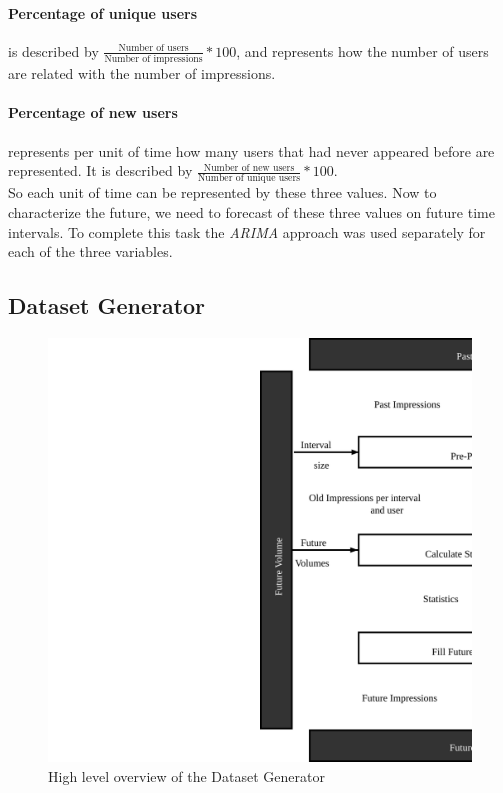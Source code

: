 \paragraph{Percentage of unique users}
is described by $\frac{\text{Number of users}}{\text{Number of impressions}}
* 100$, and represents how the number of users are related with the number of
impressions.

\paragraph{Percentage of new users}
represents per unit of time how many users that had never appeared before are
represented. It is described by $\frac{\text{Number of new users}}{\text{Number
of unique users}}*100$.
\\

So each unit of time can be represented by these three values. Now to
characterize the future, we need to forecast of these three values
on future time intervals. To complete this task the \emph{ARIMA} approach was
used separately for each of the three variables.



\subsection{Dataset Generator}

\begin{figure}[h] \begin{center} \leavevmode
\includegraphics[]{high_level_file_gen} \caption{ High level overview
of the Dataset Generator } \label{fig:highlevel_arch_file_gen} \end{center} \end{figure}

